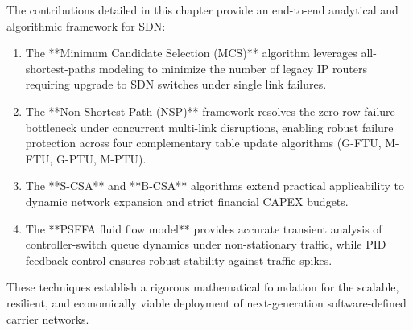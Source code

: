 The contributions detailed in this chapter provide an end-to-end analytical and algorithmic framework for SDN:
\begin{enumerate}
    \item The **Minimum Candidate Selection (MCS)** algorithm leverages all-shortest-paths modeling to minimize the number of legacy IP routers requiring upgrade to SDN switches under single link failures.
    \item The **Non-Shortest Path (NSP)** framework resolves the zero-row failure bottleneck under concurrent multi-link disruptions, enabling robust failure protection across four complementary table update algorithms (G-FTU, M-FTU, G-PTU, M-PTU).
    \item The **S-CSA** and **B-CSA** algorithms extend practical applicability to dynamic network expansion and strict financial CAPEX budgets.
    \item The **PSFFA fluid flow model** provides accurate transient analysis of controller-switch queue dynamics under non-stationary traffic, while PID feedback control ensures robust stability against traffic spikes.
\end{enumerate}
These techniques establish a rigorous mathematical foundation for the scalable, resilient, and economically viable deployment of next-generation software-defined carrier networks.
